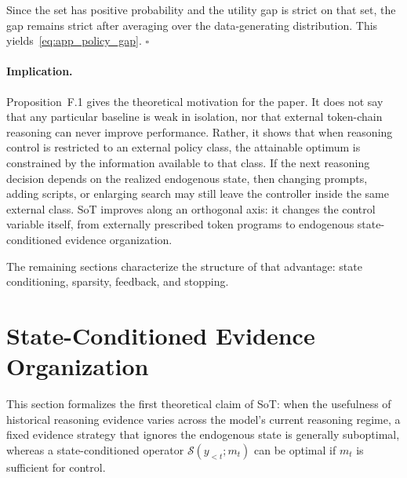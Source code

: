 Since the set has positive probability and the utility gap is strict on that set, the gap remains strict after averaging over the data-generating distribution.
This yields~\eqref{eq:app_policy_gap}.
\hfill\(\square\)

\paragraph{Implication.}
Proposition~F.1 gives the theoretical motivation for the paper.
It does not say that any particular baseline is weak in isolation, nor that external token-chain reasoning can never improve performance.
Rather, it shows that when reasoning control is restricted to an external policy class, the attainable optimum is constrained by the information available to that class.
If the next reasoning decision depends on the realized endogenous state, then changing prompts, adding scripts, or enlarging search may still leave the controller inside the same external class.
SoT improves along an orthogonal axis: it changes the control variable itself, from externally prescribed token programs to endogenous state-conditioned evidence organization.

The remaining sections characterize the structure of that advantage: state conditioning, sparsity, feedback, and stopping.

\section{State-Conditioned Evidence Organization}
\label{app:theory_state_conditioned}

This section formalizes the first theoretical claim of SoT:
when the usefulness of historical reasoning evidence varies across the model's current reasoning regime, a fixed evidence strategy that ignores the endogenous state is generally suboptimal, whereas a state-conditioned operator \(\mathcal{S}(y_{<t};m_t)\) can be optimal if \(m_t\) is sufficient for control.

